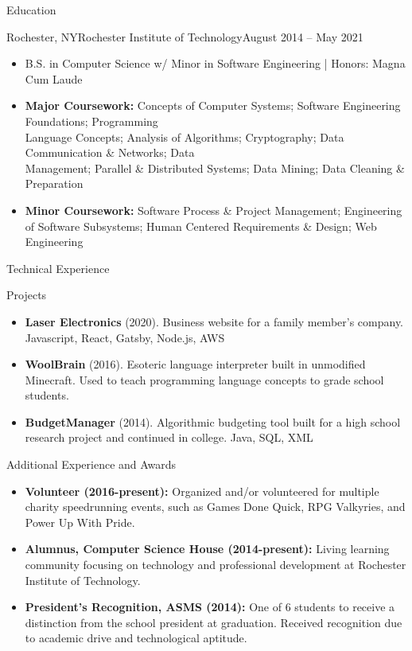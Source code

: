 \documentclass[]{mcdowellcv}
\begin{document}
	\begin{cvsection}{Education}
		\begin{cvsubsection}{Rochester, NY}{Rochester Institute of Technology}{August 2014 -- May 2021}
			\begin{itemize}
				\item B.S. in Computer Science w/ Minor in Software Engineering | Honors: Magna Cum Laude
				\item \textbf{Major Coursework:} Concepts of Computer Systems; Software Engineering Foundations; Programming \\Language Concepts; Analysis of Algorithms; Cryptography; Data Communication \& Networks; Data \\Management; Parallel \& Distributed Systems; Data Mining; Data Cleaning \& Preparation
				\item \textbf{Minor Coursework:} Software Process \& Project Management; Engineering of Software Subsystems; Human Centered Requirements \& Design; Web Engineering
			\end{itemize}
		\end{cvsubsection}
	\end{cvsection}
	
	\begin{cvsection}{Technical Experience}
		\begin{cvsubsection}{Projects}{}{}
			\begin{itemize}
				\item \textbf{Laser Electronics} (2020). Business website for a family member's company.  Javascript, React, Gatsby, Node.js, AWS
				\item \textbf{WoolBrain} (2016). Esoteric language interpreter built in unmodified Minecraft. Used to teach programming language concepts to grade school students.
				\item \textbf{BudgetManager} (2014). Algorithmic budgeting tool built for a high school research project and continued in college. Java, SQL, XML
			\end{itemize}
		\end{cvsubsection}
	\end{cvsection}
	
	\begin{cvsection}{Additional Experience and Awards}
		\begin{cvsubsection}{}{}{}	
			\begin{itemize}
				\item \textbf{Volunteer (2016-present):} Organized and/or volunteered for multiple charity speedrunning events, such as Games Done Quick, RPG Valkyries, and Power Up With Pride.
				\item \textbf{Alumnus, Computer Science House (2014-present):} Living learning community focusing on technology and professional development at Rochester Institute of Technology.
				\item \textbf{President's Recognition, ASMS (2014):} One of 6 students to receive a distinction from the school president at graduation. Received recognition due to academic drive and technological aptitude.
			\end{itemize}
		\end{cvsubsection}
	\end{cvsection}
	
\end{document}
